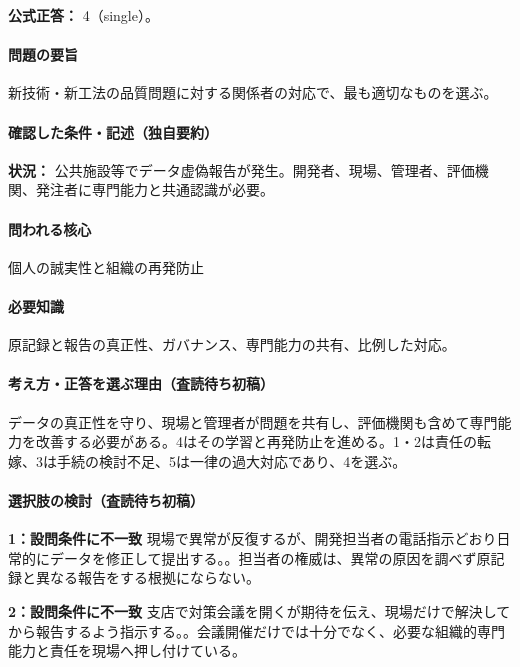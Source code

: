 \textbf{公式正答：} 4（single）。

\paragraph{問題の要旨} 新技術・新工法の品質問題に対する関係者の対応で、最も適切なものを選ぶ。

\paragraph{確認した条件・記述（独自要約）}\mbox{}\par

\noindent\textbf{状況：} 公共施設等でデータ虚偽報告が発生。開発者、現場、管理者、評価機関、発注者に専門能力と共通認識が必要。\par

\paragraph{問われる核心} 個人の誠実性と組織の再発防止

\paragraph{必要知識} 原記録と報告の真正性、ガバナンス、専門能力の共有、比例した対応。

\paragraph{考え方・正答を選ぶ理由（査読待ち初稿）} データの真正性を守り、現場と管理者が問題を共有し、評価機関も含めて専門能力を改善する必要がある。4はその学習と再発防止を進める。1・2は責任の転嫁、3は手続の検討不足、5は一律の過大対応であり、4を選ぶ。

\paragraph{選択肢の検討（査読待ち初稿）}\mbox{}\par

\noindent\textbf{1：設問条件に不一致} 現場で異常が反復するが、開発担当者の電話指示どおり日常的にデータを修正して提出する。。担当者の権威は、異常の原因を調べず原記録と異なる報告をする根拠にならない。\par

\noindent\textbf{2：設問条件に不一致} 支店で対策会議を開くが期待を伝え、現場だけで解決してから報告するよう指示する。。会議開催だけでは十分でなく、必要な組織的専門能力と責任を現場へ押し付けている。\par


